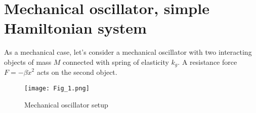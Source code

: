 \documentclass[]{article}
\title{}
\author{}
\begin{document}
\maketitle

\begin{abstract}

\end{abstract}

\section{Mechanical oscillator, simple Hamiltonian system}

As a mechanical case, let's consider a mechanical oscillator with two interacting objects of mass $M$ connected with spring of elasticity $k_g$. A resistance force $F = -\beta {\dot x}^2 $ acts on the second object.
\begin{figure}[h]
	\centering
	 \texttt{[image: Fig\_1.png]}
	 \caption{Mechanical oscillator setup}
\end{figure}\newline
\end{document}
